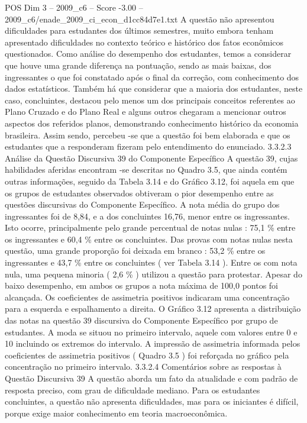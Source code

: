 \begin{textsample}{POS Dim 3 – 2009\_c6 – Score -3.00 – 2009\_c6/enade\_2009\_ci\_econ\_d1cc84d7e1.txt}
A questão não apresentou dificuldades para estudantes dos últimos semestres, muito embora tenham apresentado dificuldades no contexto teórico e histórico dos fatos econômicos questionados.
Como análise do desempenho dos estudantes, temos a considerar que houve uma grande diferença na pontuação, sendo as mais baixas, dos ingressantes o que foi constatado após o final da correção, com conhecimento dos dados estatísticos.
Também há que considerar que a maioria dos estudantes, neste caso, concluintes, destacou pelo menos um dos principais conceitos referentes ao Plano Cruzado e do Plano Real e alguns outros chegaram a mencionar outros aspectos dos referidos planos, demonstrando conhecimento histórico da economia brasileira.
Assim sendo, percebeu -se que a questão foi bem elaborada e que os estudantes que a responderam fizeram pelo entendimento do enunciado. 3.3.2.3 Análise da Questão Discursiva 39 do Componente Específico A questão 39, cujas habilidades aferidas encontram -se descritas no Quadro 3.5, que ainda contém outras informações, seguido da Tabela 3.14 e do Gráfico 3.12, foi aquela em que os grupos de estudantes observados obtiveram o pior desempenho entre as questões discursivas do Componente Específico.
A nota média do grupo dos ingressantes foi de 8,84, e a dos concluintes 16,76, menor entre os ingressantes.
Isto ocorre, principalmente pelo grande percentual de notas nulas : 75,1 \% entre os ingressantes e 60,4 \% entre os concluintes.
Das provas com notas nulas nesta questão, uma grande proporção foi deixada em branco : 53,2 \% entre os ingressantes e 43,7 \% entre os concluintes ( ver Tabela 3.14 ).
Entre os com nota nula, uma pequena minoria ( 2,6 \% ) utilizou a questão para protestar.
Apesar do baixo desempenho, em ambos os grupos a nota máxima de 100,0 pontos foi alcançada.
Os coeficientes de assimetria positivos indicaram uma concentração para a esquerda e espalhamento a direita.
O Gráfico 3.12 apresenta a distribuição das notas na questão 39 discursiva do Componente Específico por grupo de estudantes.
A moda se situou no primeiro intervalo, aquele com valores entre 0 e 10 incluindo os extremos do intervalo.
A impressão de assimetria informada pelos coeficientes de assimetria positivos ( Quadro 3.5 ) foi reforçada no gráfico pela concentração no primeiro intervalo. 3.3.2.4 Comentários sobre as respostas à Questão Discursiva 39 A questão aborda um fato da atualidade e com padrão de resposta preciso, com grau de dificuldade mediano.
Para os estudantes concluintes, a questão não apresenta dificuldades, mas para os iniciantes é difícil, porque exige maior conhecimento em teoria macroeconômica.

\end{textsample}
